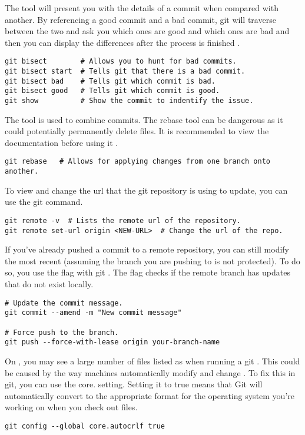 The  tool will present you with the details of a commit when compared with another. By referencing a good commit and a bad commit, git will traverse between the two and ask you which ones are good and which ones are bad and then you can display the differences after the process is finished \cite{git}\cite{git: Advanced}.
\begin{lstlisting}[style=terminalstyle]
git bisect        # Allows you to hunt for bad commits.
git bisect start  # Tells git that there is a bad commit.
git bisect bad    # Tells git which commit is bad.
git bisect good   # Tells git which commit is good.
git show          # Show the commit to indentify the issue.
\end{lstlisting}

The  tool is used to combine commits. The rebase tool can be dangerous as it could potentially permanently delete files. It is recommended to view the documentation before using it \cite{git}\cite{git: Advanced}.
\begin{lstlisting}[style=terminalstyle]
git rebase   # Allows for applying changes from one branch onto another.
\end{lstlisting}

To view and change the url that the git repository is using to update, you can use the git  command.
\begin{lstlisting}[style=terminalstyle]
git remote -v  # Lists the remote url of the repository.
git remote set-url origin <NEW-URL>  # Change the url of the repo.
\end{lstlisting}

If you've already pushed a commit to a remote repository, you can still modify the most recent  (assuming the branch you are pushing to is not protected). To do so, you use the  flag with git . The  flag checks if the remote branch has updates that do not exist locally.
\begin{lstlisting}[style=terminalstyle]
# Update the commit message.
git commit --amend -m "New commit message"

# Force push to the branch. 
git push --force-with-lease origin your-branch-name
\end{lstlisting} 

On , you may see a large number of files listed as  when running a git . This could be caused by the way  machines automatically modify and change . To fix this in git, you can use the core. setting. Setting it to true means that Git will automatically convert  to the appropriate format for the operating system you're working on when you check out files.
\begin{lstlisting}[style=terminalstyle]
git config --global core.autocrlf true
\end{lstlisting} 










